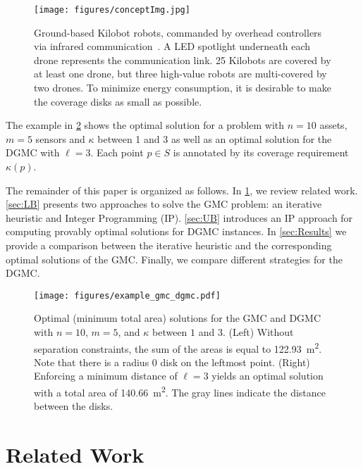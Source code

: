 \documentclass[letterpaper, 10 pt, conference]{ieeeconf}
\newcommand{\points}{S}
\newcommand{\point}{p}
\begin{document}
\begin{figure}[t]
    \centering
    \texttt{[image: figures/conceptImg.jpg]}
    \caption{\label{fig:drone}
    Ground-based Kilobot robots, commanded by overhead controllers via infrared communication~\cite{rubenstein2012kilobot}.  
    A LED spotlight underneath each drone represents the communication link.  25 Kilobots are covered by at least one drone, but three high-value robots are multi-covered by two drones. 
    To minimize energy consumption, it is desirable to make the coverage disks as small as possible.
    }
    \vspace{-1em}
\end{figure}

The example in \cref{fig:optimalsolutionexample} shows the optimal solution 
for a problem with $n=10$ assets, $m=5$ sensors and $\kappa$ between 1 and 3 as well as an optimal solution for the DGMC with $\ell=3$.
Each point $\point \in \points$ is annotated by its coverage requirement $\kappa(\point)$.

The remainder of this paper is organized as follows.
In \cref{sec:RelatedWork}, we review related work. 
\cref{sec:LB} presents two approaches to solve the GMC problem: an iterative heuristic and Integer Programming (IP).
\cref{sec:UB} introduces an IP approach for computing provably optimal solutions for DGMC instances.
In \cref{sec:Results} we provide a comparison between the iterative heuristic and the corresponding optimal solutions of the GMC.
Finally, we compare different strategies for the DGMC.



\begin{figure}[ht!]
    \centering
    \texttt{[image: figures/example\_gmc\_dgmc.pdf]}
    \caption{\label{fig:optimalsolutionexample}
        Optimal (minimum total area) solutions for the GMC and DGMC with $n=10$, $m=5$, and $\kappa$ between $1$ and $3$.
        (Left) Without separation constraints, the sum of the areas is equal to \SI{122.93}{\metre\squared}.
        Note that there is a radius $0$ disk on the leftmost point.
        (Right) Enforcing a minimum distance of $\ell=3$ yields an optimal solution with a total area of \SI{140.66}{\metre\squared}.
        The gray lines indicate the distance between the disks.
    }
\end{figure}

\section{Related Work}\label{sec:RelatedWork}
\end{document}

